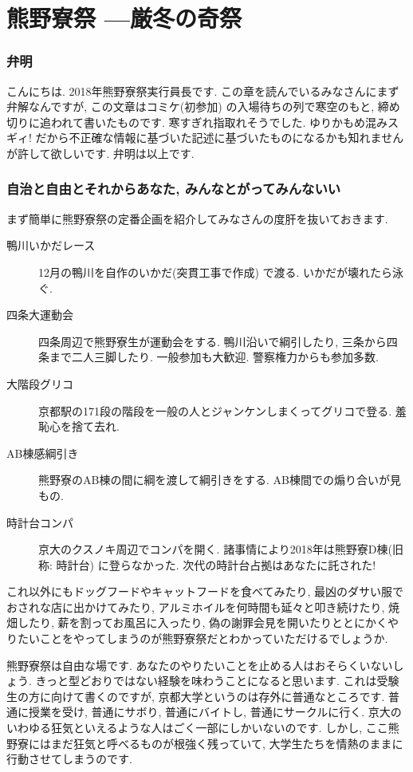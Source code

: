 \documentclass[10pt,b5jsbook,dvips,dvipdfmx,openany]{jsbook}
\theoremstyle{definition}
\begin{document}
\newpage

	\section{熊野寮祭 ---厳冬の奇祭}
			\subsubsection{弁明}
			こんにちは. 2018年熊野寮祭実行員長です. この章を読んでいるみなさんにまず弁解なんですが, この文章はコミケ(初参加) の入場待ちの列で寒空のもと, 締め切りに追われて書いたものです. 寒すぎれ指取れそうでした. ゆりかもめ混みスギィ! だから不正確な情報に基づいた記述に基づいたものになるかも知れませんが許して欲しいです. 弁明は以上です. 

			\subsubsection{自治と自由とそれからあなた, みんなとがってみんないい}
			まず簡単に熊野寮祭の定番企画を紹介してみなさんの度肝を抜いておきます. 
			\begin{description}
			\item[鴨川いかだレース] 12月の鴨川を自作のいかだ(突貫工事で作成) で渡る. いかだが壊れたら泳ぐ. 
			\item[四条大運動会] 四条周辺で熊野寮生が運動会をする. 鴨川沿いで綱引したり, 三条から四条まで二人三脚したり. 一般参加も大歓迎. 警察権力からも参加多数. 
			\item[大階段グリコ] 京都駅の171段の階段を一般の人とジャンケンしまくってグリコで登る. 羞恥心を捨て去れ. 
			\item[AB棟感綱引き]熊野寮のAB棟の間に綱を渡して綱引きをする. AB棟間での煽り合いが見もの. 
			\item[時計台コンパ]京大のクスノキ周辺でコンパを開く. 諸事情により2018年は熊野寮D棟(旧称: 時計台) に登らなかった. 次代の時計台占拠はあなたに託された!
			\end{description}

			これ以外にもドッグフードやキャットフードを食べてみたり, 最凶のダサい服でおされな店に出かけてみたり, アルミホイルを何時間も延々と叩き続けたり, 焼畑したり, 薪を割ってお風呂に入ったり, 偽の謝罪会見を開いたりととにかくやりたいことをやってしまうのが熊野寮祭だとわかっていただけるでしょうか. 

			熊野寮祭は自由な場です. あなたのやりたいことを止める人はおそらくいないしょう. きっと型どおりではない経験を味わうことになると思います. これは受験生の方に向けて書くのですが, 京都大学というのは存外に普通なところです. 普通に授業を受け, 普通にサボり, 普通にバイトし, 普通にサークルに行く. 京大のいわゆる狂気といえるような人はごく一部にしかいないのです. しかし, ここ熊野寮にはまだ狂気と呼べるものが根強く残っていて, 大学生たちを情熱のままに行動させてしまうのです. 
\end{document}
